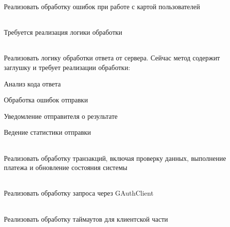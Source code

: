 \begin{DoxyRefList}
\label{todo__todo000034}%
%
Реализовать обработку ошибок при работе с картой пользователей  
\item[Member \doxylink{class_g_n_e_t_1_1_sys_send_mail3___re_ac8efa0a3f269852ac072bef063dbfc81}{GNET\+::Sys\+Send\+Mail3\+\_\+\+Re\+::Process} (Manager \texorpdfstring{$\ast$}{*}manager, Manager\+::\+Session\+::\+ID sid)]\hfill \\
\label{todo__todo000035}%
%
Требуется реализация логики обработки  
\item[Member \doxylink{class_g_n_e_t_1_1_sys_send_mail___re_aee9b57bf0d0707a080303a041e0dab0d}{GNET\+::Sys\+Send\+Mail\+\_\+\+Re\+::Process} (Manager \texorpdfstring{$\ast$}{*}manager, Manager\+::\+Session\+::\+ID sid)]\hfill \\
\label{todo__todo000036}%
%
Реализовать логику обработки ответа от сервера. Сейчас метод содержит заглушку и требует реализации обработки\+:
\begin{DoxyItemize}
\item Анализ кода ответа
\item Обработка ошибок отправки
\item Уведомление отправителя о результате
\item Ведение статистики отправки 
\end{DoxyItemize}
\item[Member \doxylink{class_g_n_e_t_1_1_trans_buy_point_aad328b963d528b2d8a695e3793c73529}{GNET\+::Trans\+Buy\+Point\+::Process} (Manager \texorpdfstring{$\ast$}{*}manager, Manager\+::\+Session\+::\+ID sid)]\hfill \\
\label{todo__todo000037}%
%
Реализовать обработку транзакций, включая проверку данных, выполнение платежа и обновление состояния системы  
\item[Member \doxylink{class_g_n_e_t_1_1_user_login2_a7d61288662e68a7168dbb4d026483086}{GNET\+::User\+Login2\+::Delivery} (Manager\+::\+Session\+::\+ID proxy\+\_\+sid, const Octets\+Stream \&os\+Arg)]\hfill \\
\label{todo__todo000039}%
%
Реализовать обработку запроса через GAuth\+Client  
\item[Member \doxylink{class_g_n_e_t_1_1_user_login2_a7d87dc03996960a49065f50388d624ef}{GNET\+::User\+Login2\+::On\+Timeout} ()]\hfill \\
\label{todo__todo000041}%
%
Реализовать обработку таймаутов для клиентской части  

\end{DoxyRefList}
